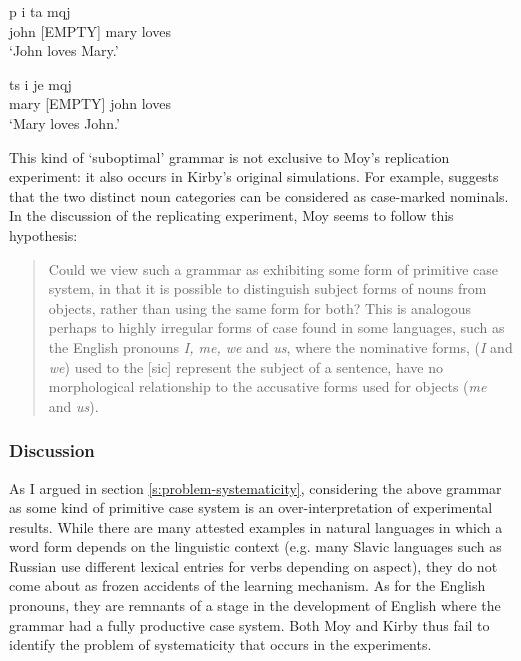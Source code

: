 \ea
\gll p i ta mqj \\
john {[EMPTY]} mary loves \\
\glt `John loves Mary.' \\

\item
\gll ts i je mqj \\
mary {[EMPTY]} john loves \\
\glt `Mary loves John.' \\
\z

This kind of `suboptimal' grammar is not exclusive to Moy's replication experiment: it also occurs in Kirby's original simulations. For example, \citet{kirby99syntax} suggests that the two distinct noun categories can be considered as case-marked nominals. In the discussion of the replicating experiment, Moy seems to follow this hypothesis:

\begin{quote}
Could we view such a grammar as exhibiting some form of primitive case system, in that it is possible to distinguish subject forms of nouns from objects, rather than using the same form for both? This is analogous perhaps to highly irregular forms of case found in some languages, such as the English pronouns {\em I, me, we} and {\em us}, where the nominative forms, ({\em I} and {\em we}) used to the [sic] represent the subject of a sentence, have no morphological relationship to the accusative forms used for objects ({\em me} and {\em us}). \citep[p. 114]{moy06case}
\end{quote}

\subsubsection{Discussion}
As I argued in section \ref{s:problem-systematicity}, considering the above grammar as some kind of primitive case system is an over-interpretation of experimental results. While there are many attested examples in natural languages in which a word form depends on the linguistic context (e.g. many Slavic languages such as Russian use different lexical entries for verbs depending on aspect), they do not come about as frozen accidents of the learning mechanism. As for the English pronouns, they are remnants of a stage in the development of English where the grammar had a fully productive case system. Both Moy and Kirby thus fail to identify the problem of systematicity that occurs in the experiments.

